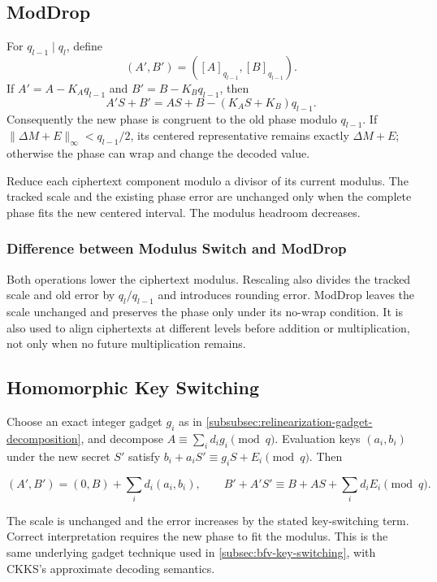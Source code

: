 \subsection{\textsf{ModDrop}}
\label{subsec:ckks-moddrop}

For $q_{l-1}\mid q_l$, define
\[
(A',B')=([A]_{q_{l-1}},[B]_{q_{l-1}}).
\]
If $A'=A-K_Aq_{l-1}$ and $B'=B-K_Bq_{l-1}$, then
\[
A'S+B'=AS+B-(K_AS+K_B)q_{l-1}.
\]
Consequently the new phase is congruent to the old phase modulo $q_{l-1}$. If $\|\Delta M+E\|_\infty<q_{l-1}/2$, its centered representative remains exactly $\Delta M+E$; otherwise the phase can wrap and change the decoded value.

\begin{tcolorbox}[title={\textbf{\tboxlabel{\ref*{subsec:ckks-moddrop}} CKKS \textsf{ModDrop}}}]
Reduce each ciphertext component modulo a divisor of its current modulus. The tracked scale and the existing phase error are unchanged only when the complete phase fits the new centered interval. The modulus headroom decreases.
\end{tcolorbox}

\subsubsection{Difference between Modulus Switch and \textsf{ModDrop}}
\label{subsubsec:ckks-moddrop-vs-modswitch}

Both operations lower the ciphertext modulus. Rescaling also divides the tracked scale and old error by $q_l/q_{l-1}$ and introduces rounding error. \textsf{ModDrop} leaves the scale unchanged and preserves the phase only under its no-wrap condition. It is also used to align ciphertexts at different levels before addition or multiplication, not only when no future multiplication remains.

\subsection{Homomorphic Key Switching}
\label{subsec:ckks-key-switching}

Choose an exact integer gadget $g_i$ as in \autoref{subsubsec:relinearization-gadget-decomposition}, and decompose $A\equiv\sum_i d_ig_i\pmod q$. Evaluation keys $(a_i,b_i)$ under the new secret $S'$ satisfy $b_i+a_iS'\equiv g_iS+E_i\pmod q$. Then
\begin{tcolorbox}[title={\textbf{\tboxlabel{\ref*{subsec:ckks-key-switching}} CKKS Key Switching}}]
\[
(A',B')=(0,B)+\sum_i d_i(a_i,b_i),\qquad
B'+A'S'\equiv B+AS+\sum_i d_iE_i\pmod q.
\]
\end{tcolorbox}
The scale is unchanged and the error increases by the stated key-switching term. Correct interpretation requires the new phase to fit the modulus. This is the same underlying gadget technique used in \autoref{subsec:bfv-key-switching}, with CKKS's approximate decoding semantics.


